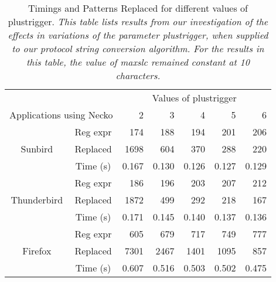 
{\normalsize
\begin{table*}[t]
\begin{center}
\small
   \begin{tabular}{|c|c|r|r|r|r|r|}
      \hline
      \multicolumn{2}{|c|}{} & \multicolumn{5}{|c|}{Values of plustrigger}\\
      \cline{3-7}
      \multicolumn{2}{|c|}{Applications using Necko}
                             & {2} & {3}  & {4} & {5} & {6} \\
      \hline
      \hline
      {}     & {Reg expr}  & {174} & {188} & {194} & {201}  & {206}   \\
      \cline{2-7}
      {Sunbird} & {Replaced}  & {1698}  & {604}  & {370} & {288}  & {220}  \\
      \cline{2-7}
      {}   & {Time (s)}  & {0.167}  & {0.130} & {0.126} & {0.127} & {0.129}  \\
      \hline
      \hline
      {}     & {Reg expr}  & {186} & {196} & {203}  & {207}  & {212}   \\
      \cline{2-7}
      {Thunderbird}   & {Replaced}  & {1872}   & {499}  & {292}  & {218}  & {167}  \\
      \cline{2-7}
      {}    & {Time (s)} & {0.171}  & {0.145}   & {0.140}  & {0.137} & {0.136}   \\
      \hline
      \hline
      {}     & {Reg expr}  & {605}   & {679}   & {717}   & {749}  & {777}   \\
      \cline{2-7}
      {Firefox}     & {Replaced}  & {7301}    & {2467}   & {1401}   & {1095}  & {857}  \\
      \cline{2-7}
      {}       & {Time (s)}  & {0.607}  & {0.516}  & {0.503}   & {0.502}   & {0.475}  \\
      \hline
   \end{tabular}
\end{center}
 \caption{Timings and Patterns Replaced for different values of plustrigger.
\it This table lists results from our
investigation of the effects in variations of the
parameter {\sf plustrigger}, when supplied to our protocol
string conversion algorithm. 
For the results in this table, the value of maxslc remained
constant at 10 characters.
}
\label{table:plustimes}
\shortline
\end{table*}
}

